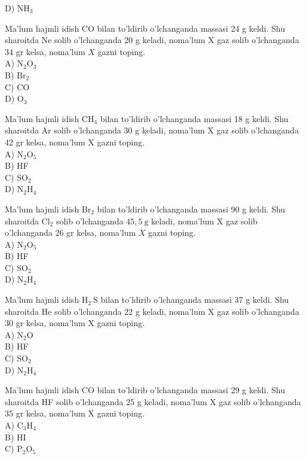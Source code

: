 D) $\mathrm{NH}_{3}$
  \item Ma'lum hajmli idish CO bilan to'ldirib o'lchanganda massasi 24 g keldi. Shu sharoitda Ne solib o'lchanganda 20 g keladi, noma'lum X gaz solib o'lchanganda 34 gr kelsa, noma'lum $X$ gazni toping.\\
A) $\mathrm{N}_{2} \mathrm{O}_{3}$\\
B) $\mathrm{Br}_{2}$\\
C) CO\\
D) $\mathrm{O}_{3}$
  \item Ma'lum hajmli idish $\mathrm{CH}_{4}$ bilan to'ldirib o'lchanganda massasi 18 g keldi. Shu sharoitda Ar solib o'lchanganda 30 g keladi, noma'lum X gaz solib o'lchanganda 42 gr kelsa, noma'lum X gazni toping.\\
A) $\mathrm{N}_{2} \mathrm{O}_{5}$\\
B) HF\\
C) $\mathrm{SO}_{2}$\\
D) $\mathrm{N}_{2} \mathrm{H}_{4}$
  \item Ma'lum hajmli idish $\mathrm{Br}_{2}$ bilan to'ldirib o'lchanganda massasi 90 g keldi. Shu sharoitda $\mathrm{Cl}_{2}$ solib o'lchanganda $45,5 \mathrm{~g}$ keladi, noma'lum X gaz solib o'lchanganda 26 gr kelsa, noma'lum $X$ gazni toping.\\
A) $\mathrm{N}_{2} \mathrm{O}_{5}$\\
B) HF\\
C) $\mathrm{SO}_{2}$\\
D) $\mathrm{N}_{2} \mathrm{H}_{4}$
  \item Ma'lum hajmli idish $\mathrm{H}_{2} \mathrm{~S}$ bilan to'ldirib o'lchanganda massasi 37 g keldi. Shu sharoitda He solib o'lchanganda 22 g keladi, noma'lum X gaz solib o'lchanganda 30 gr kelsa, noma'lum X gazni toping.\\
A) $\mathrm{N}_{2} \mathrm{O}$\\
B) HF\\
C) $\mathrm{SO}_{2}$\\
D) $\mathrm{N}_{2} \mathrm{H}_{4}$
  \item Ma'lum hajmli idish CO bilan to'ldirib o'lchanganda massasi 29 g keldi. Shu sharoitda HF solib o'lchanganda 25 g keladi, noma'lum X gaz solib o'lchanganda 35 gr kelsa, noma'lum X gazni toping.\\
A) $\mathrm{C}_{3} \mathrm{H}_{4}$\\
B) HI\\
C) $\mathrm{P}_{2} \mathrm{O}_{5}$\\
